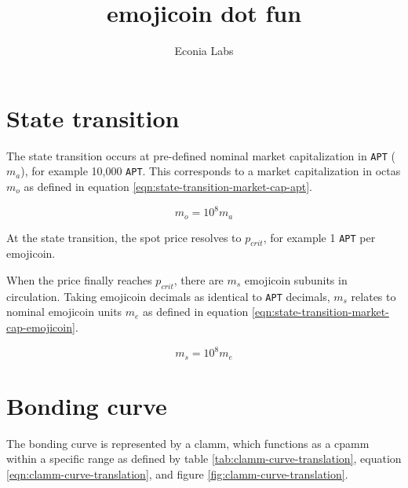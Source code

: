 \documentclass[table, twocolumn]{article}
\title{emojicoin dot fun}
\author{Econia Labs}
\date{}
\begin{document}
\maketitle

\section{State transition}

The state transition occurs at pre-defined nominal market capitalization in
\texttt{APT} ($m_a$), for example 10,000 \texttt{APT}. This corresponds to a market
capitalization in octas $m_o$ as defined in equation
\ref{eqn:state-transition-market-cap-apt}.

\begin{equation} \label{eqn:state-transition-market-cap-apt}
  m_o = 10^8 m_a
\end{equation}

At the state transition, the spot price resolves to $p_{crit}$, for example 1
\texttt{APT} per emojicoin.

When the price finally reaches $p_{crit}$, there are $m_s$ emojicoin subunits in
circulation. Taking emojicoin decimals as identical to \texttt{APT} decimals, $m_s$
relates to nominal emojicoin units $m_e$ as defined in equation
\ref{eqn:state-transition-market-cap-emojicoin}.

\begin{equation} \label{eqn:state-transition-market-cap-emojicoin}
  m_s = 10^8 m_e
\end{equation}

\section{Bonding curve}

The bonding curve is represented by a \gls{clamm}, which functions as a \gls{cpamm}
within a specific range as defined by table \ref{tab:clamm-curve-translation}, equation
\ref{eqn:clamm-curve-translation}, and figure \ref{fig:clamm-curve-translation}.
\end{document}
